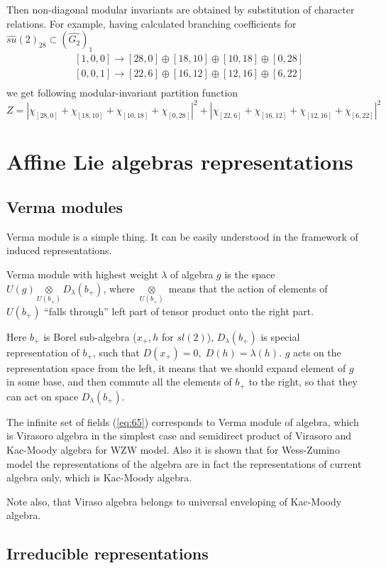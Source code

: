 \documentclass[a4paper,12pt]{article}
\theoremstyle{definition} \newtheorem{Def}{Definition}
\begin{document}
  Then non-diagonal modular invariants are obtained by substitution of character relations. For example, having calculated branching coefficients for $\hat{su}(2)_{28}\subset (\hat{G_2})_1$
  \begin{equation}
    \label{eq:113}
    \begin{aligned}
      & [1,0,0]\to [28,0]\oplus [18,10]\oplus [10,18]\oplus [0,28]\\
      & [0,0,1]\to [22,6]\oplus [16,12]\oplus [12,16]\oplus [6,22]\\
    \end{aligned}
  \end{equation}
we get following modular-invariant partition function
\begin{equation}
  \label{eq:114}
  Z=\left|\chi_{[28,0]}+\chi_{[18,10]}+\chi_{[10,18]}+\chi_{[0,28]}\right|^2+\left|\chi_{[22,6]}+\chi_{[16,12]}+\chi_{[12,16]}+\chi_{[6,22]}\right|^2
\end{equation}


\section{Affine Lie algebras representations}
\label{sec:affine-lie-algebras}

\subsection{Verma modules}
\label{sec:verma-modules}

Verma module is a simple thing. It can be easily understood in the framework of induced representations. 

Verma module with highest weight $\lambda$ of algebra $g$ is the space $U(g)\underset{U(b_{+})}{\otimes} D_{\lambda}(b_{+})$, where $\underset{U(b_{+})}{\otimes}$ means that the action of elements of $U(b_{+})$ ``falls through'' left part of tensor product onto the right part.

Here $b_{+}$ is Borel sub-algebra ($x_{+},h$ for $sl(2)$), $D_{\lambda}(b_{+})$ is special representation of $b_{+}$, such that $D(x_{+})=0,\; D(h)=\lambda(h)$.
$g$ acts on the representation space from the left, it means that we should expand element of $g$ in some base, and then commute all the elements of $b_{+}$ to the right, so that they can act on space $D_{\lambda}(b_{+})$.



The infinite set of fields (\ref{eq:65}) corresponds to Verma module of algebra, which is Virasoro algebra in the simplest case and semidirect product of Virasoro and Kac-Moody algebra for WZW model. Also it is shown that for Wess-Zumino model the representations of the algebra are in fact the representations of current algebra only, which is Kac-Moody algebra.

Note also, that Viraso algebra belongs to universal enveloping of Kac-Moody algebra.

\subsection{Irreducible representations}
\label{sec:irred-repr}


{}

\end{document}

